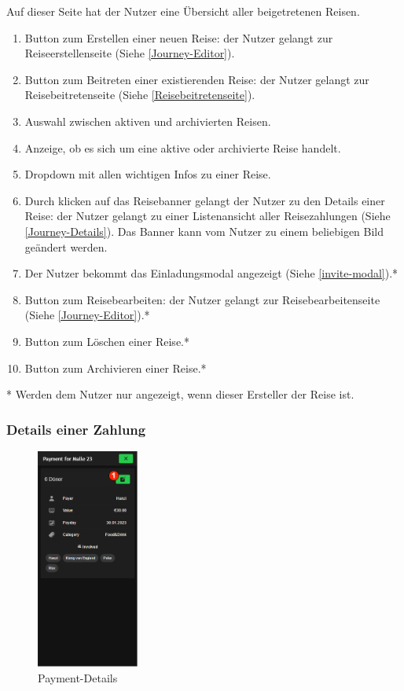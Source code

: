 Auf dieser Seite hat der Nutzer eine Übersicht aller beigetretenen Reisen.

\begin{enumerate}[label=\protect\circled{\arabic*}]
	\item Button zum Erstellen einer neuen Reise: der Nutzer gelangt zur Reiseerstellenseite  (Siehe \ref{Journey-Editor}).
	\item Button zum Beitreten einer existierenden Reise: der Nutzer gelangt zur Reisebeitretenseite (Siehe \ref{Reisebeitretenseite}).
	\item Auswahl zwischen aktiven und archivierten Reisen.
	\item Anzeige, ob es sich um eine aktive oder archivierte Reise handelt.
	\item Dropdown mit allen wichtigen Infos zu einer Reise.
	\item Durch klicken auf das Reisebanner gelangt der Nutzer zu  den Details einer Reise: der Nutzer gelangt zu einer Listenansicht aller Reisezahlungen  (Siehe \ref{Journey-Details}). Das Banner kann vom Nutzer zu einem beliebigen Bild geändert werden.
	\item Der Nutzer bekommt das Einladungsmodal angezeigt (Siehe \ref{invite-modal}).*
	\item Button zum Reisebearbeiten: der Nutzer gelangt zur Reisebearbeitenseite (Siehe \ref{Journey-Editor}).*
	\item Button zum Löschen einer Reise.*
	\item Button zum Archivieren einer Reise.*
\end{enumerate}
* Werden dem Nutzer nur angezeigt, wenn dieser Ersteller der Reise ist.
\subsubsection{Details einer Zahlung}\label{payment-details}
\begin{figure}[H]
	\centering
	\includegraphics[width=0.3\textwidth]{img/pages_numbers/payment-details.drawio}
	\caption[Payment-Details]{Payment-Details}
	\label{fig:payment-details}
\end{figure}

